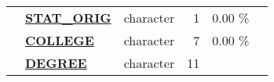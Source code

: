 \documentclass[]{article}
\begin{document}
\begin{longtable}[]{@{}lllrcl@{}}
\begin{minipage}[t]{0.08\columnwidth}
\end{minipage} & \begin{minipage}[t]{0.28\columnwidth}\raggedright\strut
\textbf{\protect\hyperlink{stat_orig}{STAT\_ORIG}}\strut
\end{minipage} & \begin{minipage}[t]{0.12\columnwidth}\raggedright\strut
character\strut
\end{minipage} & \begin{minipage}[t]{0.11\columnwidth}\raggedleft\strut
1\strut
\end{minipage} & \begin{minipage}[t]{0.10\columnwidth}\centering\strut
0.00 \%\strut
\end{minipage} & \begin{minipage}[t]{0.13\columnwidth}\raggedright\strut
\strut
\end{minipage}\tabularnewline
\begin{minipage}[t]{0.08\columnwidth}\raggedright\strut
\strut
\end{minipage} & \begin{minipage}[t]{0.28\columnwidth}\raggedright\strut
\textbf{\protect\hyperlink{college}{COLLEGE}}\strut
\end{minipage} & \begin{minipage}[t]{0.12\columnwidth}\raggedright\strut
character\strut
\end{minipage} & \begin{minipage}[t]{0.11\columnwidth}\raggedleft\strut
7\strut
\end{minipage} & \begin{minipage}[t]{0.10\columnwidth}\centering\strut
0.00 \%\strut
\end{minipage} & \begin{minipage}[t]{0.13\columnwidth}\raggedright\strut
\strut
\end{minipage}\tabularnewline
\begin{minipage}[t]{0.08\columnwidth}\raggedright\strut
\strut
\end{minipage} & \begin{minipage}[t]{0.28\columnwidth}\raggedright\strut
\textbf{\protect\hyperlink{degree}{DEGREE}}\strut
\end{minipage} & \begin{minipage}[t]{0.12\columnwidth}\raggedright\strut
character\strut
\end{minipage} & \begin{minipage}[t]{0.11\columnwidth}\raggedleft\strut
11\strut

\end{minipage}
\end{longtable}
\end{document}
